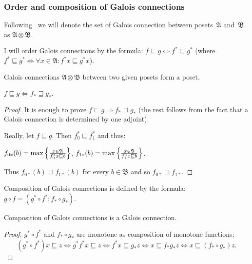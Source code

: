 \subsubsection{Order and composition of Galois connections}

Following~\cite{tprod-dist-lat} we will denote the set of Galois connection between posets~$\mathfrak{A}$ and~$\mathfrak{B}$
as $\mathfrak{A}\otimes\mathfrak{B}$.

\begin{defn}
I will order Galois connections by the formula: $f\sqsubseteq g\Leftrightarrow f^{\ast}\sqsubseteq g^{\ast}$
(where $f^{\ast}\sqsubseteq g^{\ast}\Leftrightarrow\forall x\in\mathfrak{A}:f^{\ast}x\sqsubseteq g^{\ast}x$).
\end{defn}

\begin{obvious}
Galois connections $\mathfrak{A}\otimes\mathfrak{B}$ between two given posets form a poset.
\end{obvious}

\begin{prop}
$f\sqsubseteq g\Leftrightarrow f_{\ast}\sqsupseteq g_{\ast}$.
\end{prop}

\begin{proof}
It is enough to prove $f\sqsubseteq g\Rightarrow f_{\ast}\sqsupseteq g_{\ast}$ (the rest follows from the fact that a Galois connection is determined by one adjoint).

Really, let $f\sqsubseteq g$. Then $f_0^{\ast} \sqsubseteq f_1^{\ast}$ and thus:

$f_{0 \ast} (b) = \max \left\{ \frac{ x \in \mathfrak{A} }{
f_0^{\ast} x \sqsubseteq b }\right\}$, $f_{1 \ast} (b) = \max \left\{ \frac{ x \in
\mathfrak{A} }{ f_1^{\ast} x \sqsubseteq b }\right\}$.

Thus $f_{0 \ast} (b) \sqsupseteq f_{1 \ast} (b)$ for every $b\in\mathfrak{B}$ and so $f_{0 \ast} \sqsupseteq f_{1 \ast}$.
\end{proof}

\begin{defn}
Composition of Galois connections is defined by the formula:
$g\circ f=(g^{\ast}\circ f^{\ast};f_{\ast}\circ g_{\ast})$.
\end{defn}

\begin{prop}
Composition of Galois connections is a Galois connection.
\end{prop}

\begin{proof}
$g^{\ast}\circ f^{\ast}$ and $f_{\ast}\circ g_{\ast}$ are monotone as composition of monotone functions;
\[
(g^{\ast}\circ f^{\ast})x\sqsubseteq z \Leftrightarrow g^{\ast}f^{\ast}x\sqsubseteq z \Leftrightarrow
f^{\ast}x\sqsubseteq g_{\ast} z \Leftrightarrow x\sqsubseteq f_{\ast}g_{\ast} z \Leftrightarrow x\sqsubseteq(f_{\ast}\circ g_{\ast})z.
\]
\end{proof}

